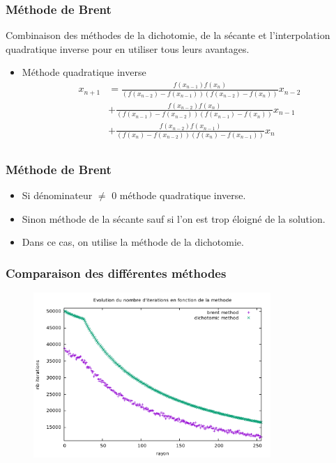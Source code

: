 \begin{frame}
\frametitle{Méthode de Brent}

Combinaison des méthodes de la dichotomie, de la sécante et l'interpolation quadratique inverse pour en utiliser tous leurs avantages.

   \begin{itemize}
      \item Méthode quadratique inverse
    \begin{equation}\begin{aligned}
         x_{n+1} &= \frac{f(x_{n-1})f(x_n)}{(f(x_{n-2})-f(x_{n-1}))(f(x_{n-2})-f(x_{n}))}x_{n-2} \\
         &+  \frac{f(x_{n-2})f(x_n)}{(f(x_{n-1})-f(x_{n-2}))(f(x_{n-1})-f(x_{n}))}x_{n-1} \\
         &+ \frac{f(x_{n-2})f(x_{n-1})}{(f(x_{n})-f(x_{n-2}))(f(x_{n})-f(x_{n-1}))}x_{n} \\
    \end{aligned}
    \end{equation}  
     

   \end{itemize}
\end{frame}



\begin{frame}
\frametitle{Méthode de Brent}

   \begin{itemize}
      \item Si dénominateur $\ne$ 0 méthode quadratique inverse.
      \item Sinon méthode de la sécante sauf si l'on est trop éloigné de la solution.
      \item Dans ce cas, on utilise la méthode de la dichotomie.
   \end{itemize}
\end{frame}



\begin{frame}
\frametitle{Comparaison des différentes méthodes}

   \begin{figure}[htb!]
      \includegraphics[width=9cm]{figures/brent_method3.pdf}
   \end{figure}
\end{frame}


